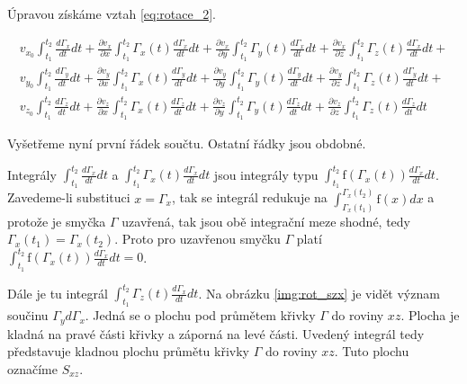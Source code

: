 \documentclass{book}
\begin{document}
Úpravou získáme vztah \eqref{eq:rotace_2}.

\begin{equation}
\label{eq:rotace_2}
\begin{matrix}
v_{x_0} \int_{t_1}^{t_2} \frac{d \Gamma_x}{dt} dt + \frac{\partial v_x}{\partial x} \int_{t_1}^{t_2} \Gamma_x(t) \frac{d \Gamma_x}{dt} dt + \frac{\partial v_x}{\partial y} \int_{t_1}^{t_2} \Gamma_y(t) \frac{d \Gamma_x}{dt} dt + \frac{\partial v_x}{\partial z} \int_{t_1}^{t_2} \Gamma_z(t) \frac{d \Gamma_x}{dt} dt + \\
v_{y_0} \int_{t_1}^{t_2} \frac{d \Gamma_y}{dt} dt + \frac{\partial v_y}{\partial x} \int_{t_1}^{t_2} \Gamma_x(t) \frac{d \Gamma_y}{dt} dt + \frac{\partial v_y}{\partial y} \int_{t_1}^{t_2} \Gamma_y(t) \frac{d \Gamma_y}{dt} dt + \frac{\partial v_y}{\partial z} \int_{t_1}^{t_2} \Gamma_z(t) \frac{d \Gamma_y}{dt} dt + \\
v_{z_0} \int_{t_1}^{t_2} \frac{d \Gamma_z}{dt} dt + \frac{\partial v_z}{\partial x} \int_{t_1}^{t_2} \Gamma_x(t) \frac{d \Gamma_z}{dt} dt + \frac{\partial v_z}{\partial y} \int_{t_1}^{t_2} \Gamma_y(t) \frac{d \Gamma_z}{dt} dt + \frac{\partial v_z}{\partial z} \int_{t_1}^{t_2} \Gamma_z(t) \frac{d \Gamma_z}{dt} dt
\end{matrix}
\end{equation}

Vyšetřeme nyní první řádek součtu. Ostatní řádky jsou obdobné.

Integrály \(\int_{t_1}^{t_2} \frac{d \Gamma_x}{dt} dt\) a \(\int_{t_1}^{t_2} \Gamma_x(t) \frac{d \Gamma_x}{dt} dt\) jsou integrály typu \(\int_{t_1}^{t_2} \mathrm{f}(\Gamma_x(t)) \frac{d \Gamma_x}{dt} dt\). Zavedeme-li substituci \(x = \Gamma_x\), tak se integrál redukuje na \(\int_{\Gamma_x(t_1)}^{\Gamma_x(t_2)} \mathrm{f}(x) dx\) a protože je smyčka \(\Gamma\) uzavřená, tak jsou obě integrační meze shodné, tedy \(\Gamma_x(t_1) = \Gamma_x(t_2)\). Proto pro uzavřenou smyčku \(\Gamma\) platí \(\int_{t_1}^{t_2} \mathrm{f}(\Gamma_x(t)) \frac{d \Gamma_x}{dt} dt = 0\).

Dále je tu integrál \(\int_{t_1}^{t_2} \Gamma_z(t) \frac{d \Gamma_x}{dt} dt\). Na obrázku \ref{img:rot_szx} je vidět význam součinu \(\Gamma_y d \Gamma_x\). Jedná se o plochu pod průmětem křivky \(\Gamma\) do roviny \(xz\). Plocha je kladná na pravé části křivky a záporná na levé části. Uvedený integrál tedy představuje kladnou plochu průmětu křivky \(\Gamma\) do roviny \(xz\). Tuto plochu označíme \(S_{xz}\).
\end{document}
